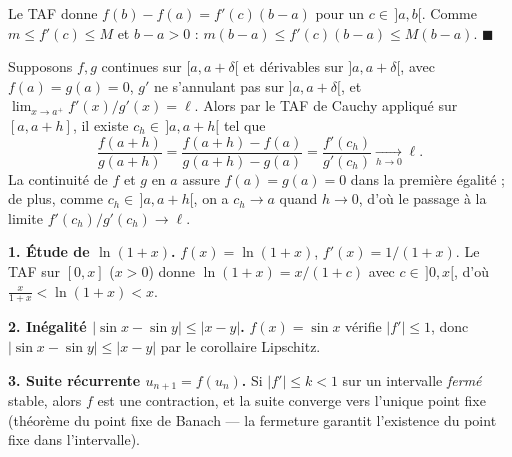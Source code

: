 
\begin{mdframed}[style=proofbar]
  Le TAF donne $f(b)-f(a) = f'(c)(b-a)$ pour un $c \in\,]a,b[$.
  Comme $m \leq f'(c) \leq M$ et $b-a > 0$ :
  $m(b-a) \leq f'(c)(b-a) \leq M(b-a)$. \hfill$\blacksquare$
\end{mdframed}

Supposons $f,g$ continues sur $[a,a+\delta[$ et dérivables sur $]a,a+\delta[$,
avec $f(a)=g(a)=0$, $g'$ ne s'annulant pas sur $]a,a+\delta[$,
et $\lim_{x\to a^+} f'(x)/g'(x) = \ell$. Alors par le TAF de Cauchy appliqué sur $[a, a+h]$,
il existe $c_h \in\, ]a, a+h[$ tel que
\[
  \frac{f(a+h)}{g(a+h)} = \frac{f(a+h)-f(a)}{g(a+h)-g(a)} = \frac{f'(c_h)}{g'(c_h)} \xrightarrow[h\to 0]{} \ell.
\]
La continuité de $f$ et $g$ en $a$ assure $f(a)=g(a)=0$ dans la première égalité ;
de plus, comme $c_h \in\, ]a, a+h[$, on a $c_h \to a$ quand $h \to 0$, d'où le passage
à la limite $f'(c_h)/g'(c_h) \to \ell$.

\decsep{}



\begin{mdframed}[style=exbar]
  \textbf{1. Étude de $\ln(1+x)$.}\enspace%
  $f(x)=\ln(1+x)$, $f'(x)=1/(1+x)$. Le TAF sur $[0,x]$ ($x>0$) donne
  $\ln(1+x) = x/(1+c)$ avec $c \in\,]0,x[$, d'où $\frac{x}{1+x} < \ln(1+x) < x$.

  \smallskip\noindent
  \textbf{2. Inégalité $|\sin x - \sin y| \leq |x-y|$.}\enspace%
  $f(x) = \sin x$ vérifie $|f'| \leq 1$, donc $|\sin x - \sin y| \leq |x-y|$
  par le corollaire Lipschitz.

  \smallskip\noindent
  \textbf{3. Suite récurrente $u_{n+1} = f(u_n)$.}\enspace%
  Si $|f'| \leq k < 1$ sur un intervalle \emph{fermé} stable, alors $f$ est une
  contraction, et la suite converge vers l'unique point fixe
  (théorème du point fixe de Banach ---
  la fermeture garantit l'existence du point fixe dans l'intervalle).
\end{mdframed}


